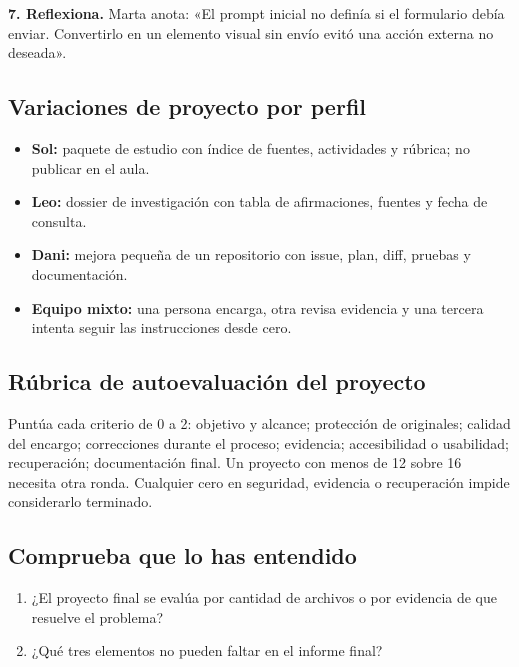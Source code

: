 \documentclass[10pt,a4paper,openany]{book}
\providecommand{\tightlist}{\setlength{\itemsep}{0.18em}\setlength{\parskip}{0pt}}
\begin{document}
\textbf{7. Reflexiona.} Marta anota: «El prompt inicial no definía si el
formulario debía enviar. Convertirlo en un elemento visual sin envío
evitó una acción externa no deseada».

\subsection{Variaciones de proyecto por
perfil}\label{variaciones-de-proyecto-por-perfil}

\begin{itemize}
\tightlist
\item
  \textbf{Sol:} paquete de estudio con índice de fuentes, actividades y
  rúbrica; no publicar en el aula.
\item
  \textbf{Leo:} dossier de investigación con tabla de afirmaciones,
  fuentes y fecha de consulta.
\item
  \textbf{Dani:} mejora pequeña de un repositorio con issue, plan, diff,
  pruebas y documentación.
\item
  \textbf{Equipo mixto:} una persona encarga, otra revisa evidencia y
  una tercera intenta seguir las instrucciones desde cero.
\end{itemize}

\subsection{Rúbrica de autoevaluación del
proyecto}\label{ruxfabrica-de-autoevaluaciuxf3n-del-proyecto}

Puntúa cada criterio de 0 a 2: objetivo y alcance; protección de
originales; calidad del encargo; correcciones durante el proceso;
evidencia; accesibilidad o usabilidad; recuperación; documentación
final. Un proyecto con menos de 12 sobre 16 necesita otra ronda.
Cualquier cero en seguridad, evidencia o recuperación impide
considerarlo terminado.

\subsection{Comprueba que lo has
entendido}\label{comprueba-que-lo-has-entendido-19}

\begin{enumerate}
\def\labelenumi{\arabic{enumi}.}
\tightlist
\item
  ¿El proyecto final se evalúa por cantidad de archivos o por evidencia
  de que resuelve el problema?
\item
  ¿Qué tres elementos no pueden faltar en el informe final?
\end{enumerate}
\end{document}
